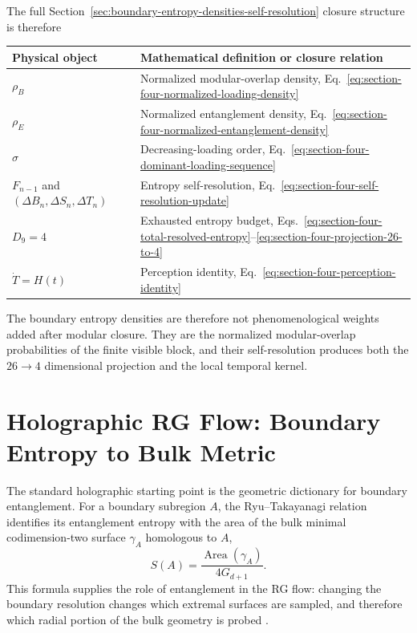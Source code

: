 \documentclass[11pt,letterpaper]{article}
\theoremstyle{plain}
\begin{document}
The full Section~\ref{sec:boundary-entropy-densities-self-resolution}
closure structure is therefore
\begin{center}
\begin{tabular}{@{}ll@{}}
\toprule
Physical object & Mathematical definition or closure relation \\
\midrule
$\rho_B$ & Normalized modular-overlap density, Eq.~\eqref{eq:section-four-normalized-loading-density} \\
$\rho_E$ & Normalized entanglement density, Eq.~\eqref{eq:section-four-normalized-entanglement-density} \\
$\sigma$ & Decreasing-loading order, Eq.~\eqref{eq:section-four-dominant-loading-sequence} \\
$F_{n-1}$ and $(\Delta B_n,\Delta S_n,\Delta T_n)$ & Entropy self-resolution, Eq.~\eqref{eq:section-four-self-resolution-update} \\
$D_9=4$ & Exhausted entropy budget, Eqs.~\eqref{eq:section-four-total-resolved-entropy}--\eqref{eq:section-four-projection-26-to-4} \\
$\dot T=H(t)$ & Perception identity, Eq.~\eqref{eq:section-four-perception-identity} \\
\bottomrule
\end{tabular}
\end{center}
The boundary entropy densities are therefore not phenomenological weights added
after modular closure.  They are the normalized modular-overlap probabilities
of the finite visible block, and their self-resolution produces both the
$26\to4$ dimensional projection and the local temporal kernel.

\section{Holographic RG Flow: Boundary Entropy to Bulk Metric}
\label{sec:holographic-rg-flow-boundary-entropy-bulk-metric}

The standard holographic starting point is the geometric dictionary for
boundary entanglement.  For a boundary subregion $A$, the Ryu--Takayanagi
relation identifies its entanglement entropy with the area of the bulk minimal
codimension-two surface $\gamma_A$ homologous to $A$,
\begin{equation}
\label{eq:section-five-rt-formula}
 S(A)
 =
 \frac{\operatorname{Area}(\gamma_A)}{4G_{d+1}}.
\end{equation}
This formula supplies the role of entanglement in the RG flow: changing the
boundary resolution changes which extremal surfaces are sampled, and therefore
which radial portion of the bulk geometry is probed
\cite{ryu2006,maldacena1998,gkp1998,witten1998}.
\end{document}
